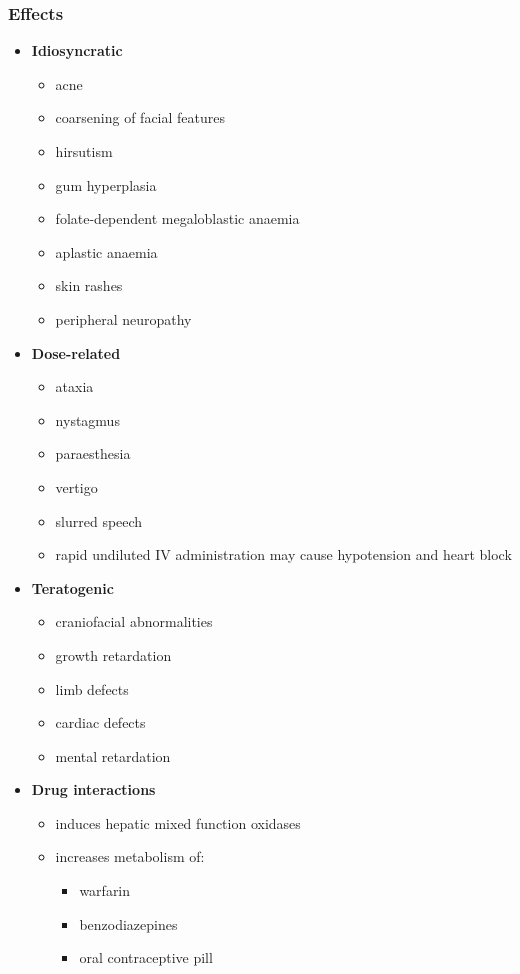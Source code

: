 \documentclass[11pt,a4paper]{article}
\begin{document}
\subsubsection{Effects}
\begin{itemize}
  \item \textbf{Idiosyncratic}
  \begin{itemize}
    \item acne
    \item coarsening of facial features
    \item hirsutism
    \item gum hyperplasia
    \item folate-dependent megaloblastic anaemia
    \item aplastic anaemia
    \item skin rashes
    \item peripheral neuropathy
  \end{itemize}
  \item \textbf{Dose-related}
  \begin{itemize}
    \item ataxia
    \item nystagmus
    \item paraesthesia
    \item vertigo
    \item slurred speech
    \item rapid undiluted IV administration may cause hypotension and heart block
  \end{itemize}
  \item \textbf{Teratogenic}
  \begin{itemize}
    \item craniofacial abnormalities
    \item growth retardation
    \item limb defects
    \item cardiac defects
    \item mental retardation
  \end{itemize}
  \item \textbf{Drug interactions}
  \begin{itemize}
    \item induces hepatic mixed function oxidases
    \item increases metabolism of:
    \begin{itemize}
      \item warfarin
      \item benzodiazepines
      \item oral contraceptive pill

\end{itemize}
\end{itemize}
\end{itemize}
\end{document}
